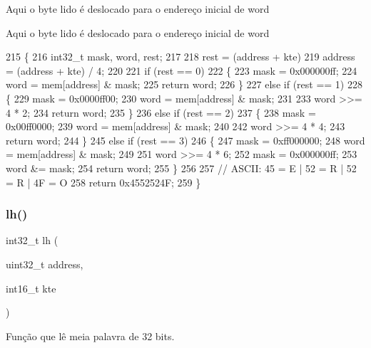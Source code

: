 Aqui o byte lido é deslocado para o endereço inicial de word

Aqui o byte lido é deslocado para o endereço inicial de word 
\begin{DoxyCode}
215 \{
216     int32\_t mask, word, rest;
217 
218     rest = (address + kte) %
219     address = (address + kte) / 4;
220 
221     \textcolor{keywordflow}{if} (rest == 0)
222     \{
223         mask = 0x000000ff;
224         word = mem[address] & mask;
225         \textcolor{keywordflow}{return} word;
226     \}
227     \textcolor{keywordflow}{else} \textcolor{keywordflow}{if} (rest == 1)
228     \{
229         mask = 0x0000ff00;
230         word = mem[address] & mask;
231 
233         word >>= 4 * 2;
234         \textcolor{keywordflow}{return} word;
235     \}
236     \textcolor{keywordflow}{else} \textcolor{keywordflow}{if} (rest == 2)
237     \{
238         mask = 0x00ff0000;
239         word = mem[address] & mask;
240 
242         word >>= 4 * 4;
243         \textcolor{keywordflow}{return} word;
244     \}
245     \textcolor{keywordflow}{else} \textcolor{keywordflow}{if} (rest == 3)
246     \{
247         mask = 0xff000000;
248         word = mem[address] & mask;
249 
251         word >>= 4 * 6;
252         mask = 0x000000ff;
253         word &= mask;
254         \textcolor{keywordflow}{return} word;
255     \}
256 
257     \textcolor{comment}{// ASCII: 45 = E | 52 = R | 52 = R | 4F = O}
258     \textcolor{keywordflow}{return} 0x4552524F;
259 \}
\end{DoxyCode}
\mbox{\label{memory_8c_ac88d72bea8a4bde4942a99746da9e759}} 
\subsubsection{lh()}
{\footnotesize\ttfamily int32\+\_\+t lh (\begin{DoxyParamCaption}\item[{uint32\+\_\+t}]{address,  }\item[{int16\+\_\+t}]{kte }\end{DoxyParamCaption})}



Função que lê meia palavra de 32 bits. 

